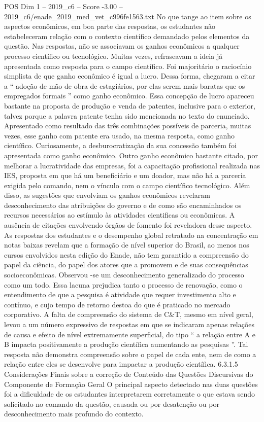 \begin{textsample}{POS Dim 1 – 2019\_c6 – Score -3.00 – 2019\_c6/enade\_2019\_med\_vet\_c996fe1563.txt}
No que tange ao item sobre os aspectos econômicos, em boa parte das respostas, os estudantes não estabeleceram relação com o contexto científico demandado pelos elementos da questão.
Nas respostas, não se associavam os ganhos econômicos a qualquer processo científico ou tecnológico.
Muitas vezes, refraseavam a ideia já apresentada como resposta para o campo científico.
Foi majoritário o raciocínio simplista de que ganho econômico é igual a lucro.
Dessa forma, chegaram a citar a “ adoção de mão de obra de estagiários, por elas serem mais baratas que os empregados formais ” como ganho econômico.
Essa concepção de lucro apareceu bastante na proposta de produção e venda de patentes, inclusive para o exterior, talvez porque a palavra patente tenha sido mencionada no texto do enunciado.
Apresentado como resultado das três combinações possíveis de parceria, muitas vezes, esse ganho com patente era usado, na mesma resposta, como ganho científico.
Curiosamente, a desburocratização da sua concessão também foi apresentada como ganho econômico.
Outro ganho econômico bastante citado, por melhorar a lucratividade das empresas, foi a capacitação profissional realizada nas IES, proposta em que há um beneficiário e um doador, mas não há a parceria exigida pelo comando, nem o vínculo com o campo científico tecnológico.
Além disso, as sugestões que envolviam os ganhos econômicos revelaram desconhecimento das atribuições do governo e de como são encaminhados os recursos necessários ao estímulo às atividades cientificas ou econômicas.
A ausência de citações envolvendo órgãos de fomento foi reveladora desse aspecto.
As respostas dos estudantes e o desempenho global retratado na concentração em notas baixas revelam que a formação de nível superior do Brasil, ao menos nos cursos envolvidos nesta edição do Enade, não tem garantido a compreensão do papel da ciência, do papel dos atores que a promovem e de suas consequências socioeconômicas.
Observou -se um desconhecimento generalizado do processo como um todo.
Essa lacuna prejudica tanto o processo de renovação, como o entendimento de que a pesquisa é atividade que requer investimento alto e contínuo, e cujo tempo de retorno destoa do que é praticado no mercado corporativo.
A falta de compreensão do sistema de C\&T, mesmo em nível geral, levou a um número expressivo de respostas em que se indicaram apenas relações de causa e efeito de nível extremamente superficial, do tipo “ a relação entre A e B impacta positivamente a produção científica aumentando as pesquisas ”.
Tal resposta não demonstra compreensão sobre o papel de cada ente, nem de como a relação entre eles se desenvolve para impactar a produção científica. 6.3.1.5 Considerações Finais sobre a correção de Conteúdo das Questões Discursivas do Componente de Formação Geral O principal aspecto detectado nas duas questões foi a dificuldade de os estudantes interpretarem corretamente o que estava sendo solicitado no comando da questão, causada ou por desatenção ou por desconhecimento mais profundo do contexto.

\end{textsample}
